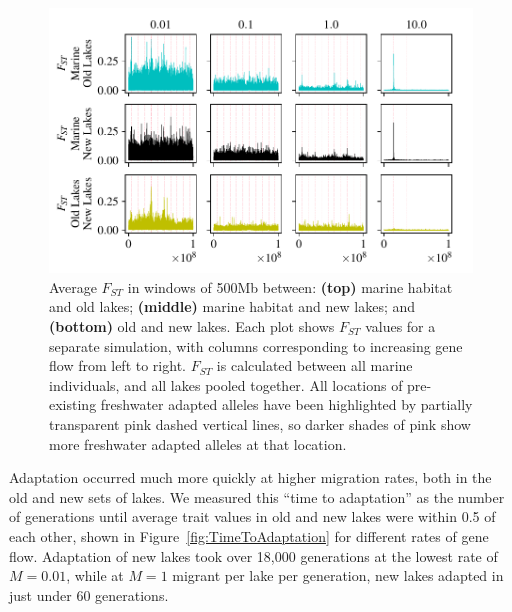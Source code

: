 \documentclass{article}
\begin{document}
\begin{figure}
    \begin{center}
        \includegraphics[width=\textwidth]{Final_Plots/Fst_Genome_faa.pdf}
          \caption{
        Average $F_{ST}$ in windows of 500Mb between:
        \textbf{(top)} marine habitat and old lakes;
        \textbf{(middle)} marine habitat and new lakes; and
        \textbf{(bottom)} old and new lakes.
        Each plot shows $F_{ST}$ values for a separate simulation,
        with columns corresponding to increasing gene flow from left to right.
        $F_{ST}$ is calculated between all marine individuals, and all lakes pooled together.
        All locations of pre-existing freshwater adapted alleles have been highlighted by 
        partially transparent pink dashed vertical lines, so darker shades of pink show more 
        freshwater adapted alleles at that location.
     } \label{fig:Fst}
    \end{center}
\end{figure}

Adaptation occurred much more quickly at higher migration rates, both in the old and new sets of lakes. We measured this ``time to adaptation'' as the number of generations until average trait values in old and new lakes were within 0.5 of each other, shown in Figure~\ref{fig:TimeToAdaptation} for different rates of gene flow. Adaptation of new lakes took over 18,000 generations at the lowest rate of $M = 0.01$, while at $M = 1$ migrant per lake per generation, new lakes adapted in just under 60 generations. 
\end{document}
